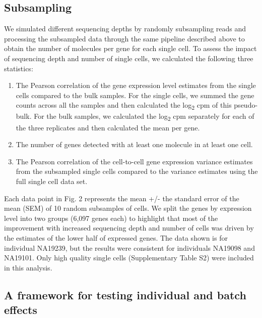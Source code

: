 \subsection{Subsampling}\label{subsampling}

We simulated different sequencing depths by randomly subsampling reads
and processing the subsampled data through the same pipeline described
above to obtain the number of molecules per gene for each single cell.
To assess the impact of sequencing depth and number of single cells, we
calculated the following three statistics:

\begin{enumerate}
\def\labelenumi{\arabic{enumi}.}
\itemsep1pt\parskip0pt
\item
  The Pearson correlation of the gene expression level estimates from
  the single cells compared to the bulk samples. For the single cells,
  we summed the gene counts across all the samples and then calculated
  the log\textsubscript{2} cpm of this pseudo-bulk. For the bulk
  samples, we calculated the log\textsubscript{2} cpm separately for
  each of the three replicates and then calculated the mean per gene.
\item
  The number of genes detected with at least one molecule in at least
  one cell.
\item
  The Pearson correlation of the cell-to-cell gene expression variance
  estimates from the subsampled single cells compared to the variance
  estimates using the full single cell data set.
\end{enumerate}

Each data point in Fig. 2 represents the mean +/- the standard error of
the mean (SEM) of 10 random subsamples of cells. We split the genes by
expression level into two groups (6,097 genes each) to highlight that
most of the improvement with increased sequencing depth and number of
cells was driven by the estimates of the lower half of expressed genes.
The data shown is for individual NA19239, but the results were
consistent for individuals NA19098 and NA19101. Only high quality single
cells (Supplementary Table S2) were included in this analysis.

\subsection{A framework for testing individual and batch
effects}\label{a-framework-for-testing-individual-and-batch-effects}

